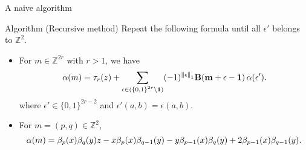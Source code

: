 \documentclass[aspectratio={169}]{beamer}
\begin{document}
\begin{frame}{A naive algorithm}
\begin{block}{Algorithm (Recursive method)}
 Repeat the following formula until all $\epsilon'$ belongs to ${\mathbb{Z}}^{2}$. \\
\begin{itemize}
    \item For $m \in {\mathbb{Z}}^{2r}$ with $r>1$, we have
\begin{equation*}
\operatorname{\alpha}(m)
= \tau_r(z) + \sum_{{\epsilon \in {(\{0,1\}}^{2r}}\setminus\mathbf{1})} (-1)^{\left\lVert\epsilon\right\rVert_1}\textbf{B}(\mathbf{\mathbf{m} + \epsilon - \mathbf{1}})\operatorname{\alpha}(\epsilon') . 
\end{equation*}
where $\epsilon' \in {\{0,1\}}^{2r-2}$ and $\epsilon'(a,b)=\epsilon(a,b)$.
\vskip 0.5cm
\item For $m=(p,q) \in \mathbb{Z}^2 $, 
\begin{equation*}
 \operatorname{\alpha}(m) = \beta_{p}(x)\beta_{q}(y)z - x\beta_{p}(x)\beta_{q-1}(y) - y\beta_{p-1}(x)\beta_{q}(y) + 2\beta_{p-1}(x)\beta_{q-1}(y).
\end{equation*}
\end{itemize}
\vskip 0.5cm
\end{block}
\end{frame}
\end{document}
